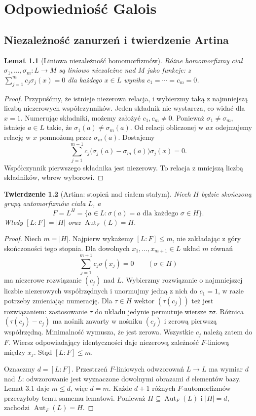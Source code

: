 \documentclass[11pt,a4paper,oneside]{book}
\numberwithin{equation}{section}
\theoremstyle{plain}
\newtheorem{twierdzenie}{Twierdzenie}[chapter]
\newtheorem{lemat}[twierdzenie]{Lemat}
\theoremstyle{definition}
\theoremstyle{remark}
\newcommand{\Aut}{\operatorname{Aut}}
\begin{document}
\chapter{Odpowiedniość Galois}

\section{Niezależność zanurzeń i twierdzenie Artina}

\begin{lemat}[Liniowa niezależność homomorfizmów]
Różne homomorfizmy ciał $\sigma_1,\dots,\sigma_m:L\to M$ są liniowo niezależne nad $M$ jako funkcje: z $\sum_{j=1}^m c_j\sigma_j(x)=0$ dla każdego $x\in L$ wynika $c_1=\cdots=c_m=0$.
\end{lemat}
\begin{proof}
Przypuśćmy, że istnieje niezerowa relacja, i wybierzmy taką z najmniejszą liczbą niezerowych współczynników. Jeden składnik nie wystarcza, co widać dla $x=1$. Numerując składniki, możemy założyć $c_1,c_m\ne0$. Ponieważ $\sigma_1\ne\sigma_m$, istnieje $a\in L$ takie, że $\sigma_1(a)\ne\sigma_m(a)$. Od relacji obliczonej w $ax$ odejmujemy relację w $x$ pomnożoną przez $\sigma_m(a)$. Dostajemy
\[
\sum_{j=1}^{m-1}c_j\bigl(\sigma_j(a)-\sigma_m(a)\bigr)\sigma_j(x)=0.
\]
Współczynnik pierwszego składnika jest niezerowy. To relacja z mniejszą liczbą składników, wbrew wyborowi.
\end{proof}

\begin{twierdzenie}[Artina: stopień nad ciałem stałym]
Niech $H$ będzie skończoną grupą automorfizmów ciała $L$, a
\[
F=L^H=\{a\in L:\sigma(a)=a\text{ dla każdego }\sigma\in H\}.
\]
Wtedy $[L:F]=|H|$ oraz $\Aut_F(L)=H$.
\end{twierdzenie}
\begin{proof}
Niech $m=|H|$. Najpierw wykażemy $[L:F]\le m$, nie zakładając z góry skończoności tego stopnia. Dla dowolnych $x_1,\dots,x_{m+1}\in L$ układ $m$ równań
\[
\sum_{j=1}^{m+1}c_j\sigma(x_j)=0\qquad(\sigma\in H)
\]
ma niezerowe rozwiązanie $(c_j)$ nad $L$. Wybierzmy rozwiązanie o najmniejszej liczbie niezerowych współrzędnych i unormujmy jedną z nich do $c_1=1$, w razie potrzeby zmieniając numerację. Dla $\tau\in H$ wektor $(\tau(c_j))$ też jest rozwiązaniem: zastosowanie $\tau$ do układu jedynie permutuje wiersze $\tau\sigma$. Różnica $(\tau(c_j)-c_j)$ ma nośnik zawarty w nośniku $(c_j)$ i zerową pierwszą współrzędną. Minimalność wymusza, że jest zerowa. Wszystkie $c_j$ należą zatem do $F$. Wiersz odpowiadający identyczności daje niezerową zależność $F$-liniową między $x_j$. Stąd $[L:F]\le m$.

Oznaczmy $d=[L:F]$. Przestrzeń $F$-liniowych odwzorowań $L\to L$ ma wymiar $d$ nad $L$: odwzorowanie jest wyznaczone dowolnymi obrazami $d$ elementów bazy. Lemat 3.1 daje $m\le d$, więc $d=m$. Każde $d+1$ różnych $F$-automorfizmów przeczyłoby temu samemu lematowi. Ponieważ $H\subseteq\Aut_F(L)$ i $|H|=d$, zachodzi $\Aut_F(L)=H$.
\end{proof}
\end{document}
